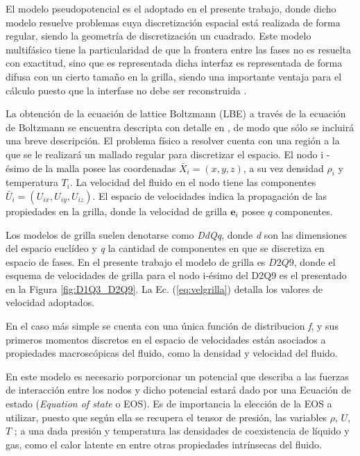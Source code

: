 El modelo pseudopotencial es el adoptado en el presente trabajo, donde dicho modelo resuelve problemas cuya discretización espacial está realizada de forma regular, siendo la geometría de discretización un cuadrado. Este modelo multifásico tiene la particularidad de que la frontera entre las fases no es resuelta con exactitud, sino que es representada dicha interfaz es representada de forma difusa con un cierto tamaño en la grilla, siendo una importante ventaja para el cálculo puesto que la interfase no debe ser reconstruida \cite{parrill2019reviews}.


La obtención de la ecuación de lattice Boltzmann (LBE) a través de la ecuación de Boltzmann se encuentra descripta con detalle en \cite{kruger2017lattice}, de modo que sólo se incluirá una breve descripción. El problema físico a resolver cuenta con una región a la que se le realizará un mallado regular para discretizar el espacio. El nodo i - ésimo de la malla posee las coordenadas ${\bar{X}}_{i} = (x,y,z)$, a su vez densidad $\rho_{i}$ y temperatura $T_{i}$. La velocidad del fluido en el nodo tiene las componentes ${\bar{U}}_{i} = ({U}_{ix},{U}_{iy},{U}_{iz})$. El espacio de velocidades indica la propagación de las propiedades en la grilla, donde la velocidad de grilla $\mathbf{e}_{i}$ posee $q$ componentes.

Los modelos de grilla suelen denotarse como \textit{DdQq}, donde \textit{d} son las dimensiones del espacio euclídeo y \textit{q} la cantidad de componentes en que se discretiza en espacio de fases. En el presente trabajo el modelo de grilla es $D2Q9$, donde el esquema de velocidades de grilla para el nodo i-ésimo del D2Q9 es el presentado en la Figura \ref{fig:D1Q3_D2Q9}. La Ec. (\ref{eq:velgrilla}) detalla los valores de velocidad adoptados. 

En el caso más simple se cuenta con una única función de distribucion \textit{f}, y sus primeros momentos discretos en el espacio de velocidades están asociados a propiedades macroscópicas del fluido, como la densidad y velocidad del fluido.

En este modelo es necesario porporcionar un potencial que describa a las fuerzas de interacción entre los nodos y dicho potencial estará dado por una Ecuación de estado (\textit{Equation of state} o EOS). Es de importancia la elección de la EOS a utilizar, puesto que según ella se recupera el tensor de presión, las variables $\rho$, $U$, $T$ ; a una dada presión y temperatura las densidades de coexistencia de líquido y gas, como el calor latente en entre otras propiedades intrínsecas del fluido.

